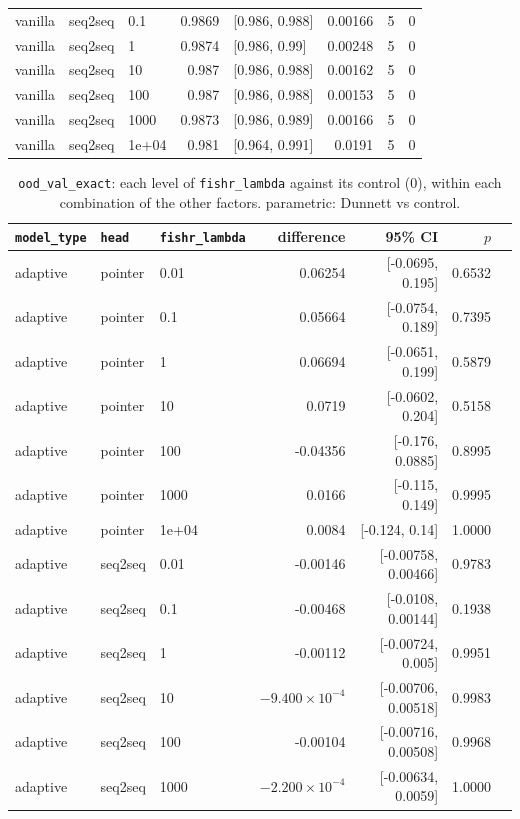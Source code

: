 \documentclass[10pt]{article}
\begin{document}
{\begin{longtable}{lllrlrrr}
vanilla & seq2seq & 0.1 & 0.9869 & [0.986, 0.988] & 0.00166 & 5 & 0\\
vanilla & seq2seq & 1 & 0.9874 & [0.986, 0.99] & 0.00248 & 5 & 0\\
vanilla & seq2seq & 10 & 0.987 & [0.986, 0.988] & 0.00162 & 5 & 0\\
vanilla & seq2seq & 100 & 0.987 & [0.986, 0.988] & 0.00153 & 5 & 0\\
vanilla & seq2seq & 1000 & 0.9873 & [0.986, 0.989] & 0.00166 & 5 & 0\\
vanilla & seq2seq & 1e+04 & 0.981 & [0.964, 0.991] & 0.0191 & 5 & 0\\
\bottomrule
\end{longtable}
}

{\small
\begin{longtable}{lllrrrl}
\caption{\texttt{ood\_val\_exact}: each level of \texttt{fishr\_lambda} against its control (0), within each combination of the other factors. parametric: Dunnett vs control.}\label{tab:control-ood_val_exact}\\
\toprule
\texttt{model\_type} & \texttt{head} & \texttt{fishr\_lambda} & difference & 95\% CI & $p$ & \\
\midrule
\endhead
adaptive & pointer & 0.01 & 0.06254 & [-0.0695, 0.195] & 0.6532 & \\
adaptive & pointer & 0.1 & 0.05664 & [-0.0754, 0.189] & 0.7395 & \\
adaptive & pointer & 1 & 0.06694 & [-0.0651, 0.199] & 0.5879 & \\
adaptive & pointer & 10 & 0.0719 & [-0.0602, 0.204] & 0.5158 & \\
adaptive & pointer & 100 & -0.04356 & [-0.176, 0.0885] & 0.8995 & \\
adaptive & pointer & 1000 & 0.0166 & [-0.115, 0.149] & 0.9995 & \\
adaptive & pointer & 1e+04 & 0.0084 & [-0.124, 0.14] & 1.0000 & \\
adaptive & seq2seq & 0.01 & -0.00146 & [-0.00758, 0.00466] & 0.9783 & \\
adaptive & seq2seq & 0.1 & -0.00468 & [-0.0108, 0.00144] & 0.1938 & \\
adaptive & seq2seq & 1 & -0.00112 & [-0.00724, 0.005] & 0.9951 & \\
adaptive & seq2seq & 10 & $-9.400\times10^{-4}$ & [-0.00706, 0.00518] & 0.9983 & \\
adaptive & seq2seq & 100 & -0.00104 & [-0.00716, 0.00508] & 0.9968 & \\
adaptive & seq2seq & 1000 & $-2.200\times10^{-4}$ & [-0.00634, 0.0059] & 1.0000 & \\

\end{longtable}}
\end{document}
